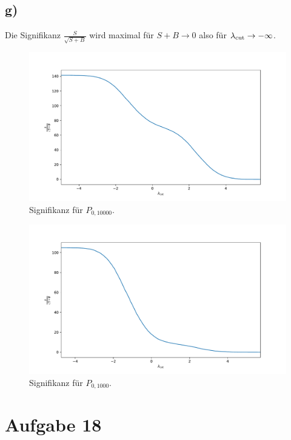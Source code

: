 \documentclass[a4paper, 11pt]{article}
\begin{document}
\subsection*{g)}
Die Signifikanz $\frac{S}{\sqrt{S + B}}$ wird maximal für $S + B \rightarrow 0$ also für $\lambda_\textup{cut} \rightarrow -\infty$.
\begin{figure}
    \centering
    \includegraphics[width=\textwidth]{../A16/A16g_10000.pdf}
    \caption{Signifikanz für $P_{0, 10000}$.}
    \label{fig:A16g_10000}
\end{figure}
\begin{figure}
    \centering
    \includegraphics[width=\textwidth]{../A16/A16g_1000.pdf}
    \caption{Signifikanz für $P_{0, 1000}$.}
    \label{fig:A16g_1000}
\end{figure}
\FloatBarrier



\section*{Aufgabe 18}
\end{document}
